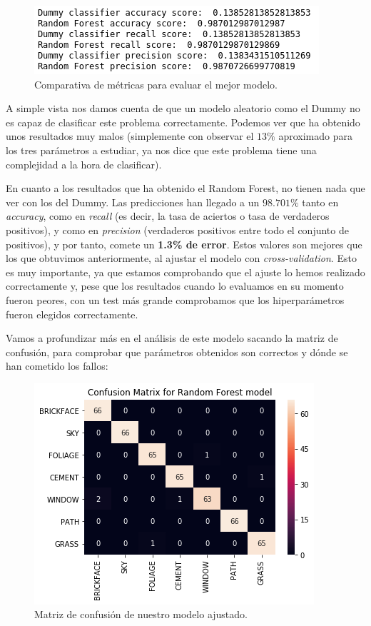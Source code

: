 \documentclass[11pt,a4paper]{article}
\begin{document}
\begin{figure}[H]
    \centering
    \includegraphics{img/model-comp-scores.png}
    \caption{Comparativa de métricas para evaluar el mejor modelo.}
    \label{fig:model-comp-scores}
\end{figure}

A simple vista nos damos cuenta de que un modelo aleatorio como el Dummy no es capaz de clasificar este problema correctamente. Podemos
ver que ha obtenido unos resultados muy malos (simplemente con observar el $13\%$ aproximado para los tres parámetros a estudiar, ya nos
dice que este problema tiene una complejidad a la hora de clasificar).

En cuanto a los resultados que ha obtenido el Random Forest, no tienen nada que ver con los del Dummy. Las predicciones han llegado a un
$98.701\%$ tanto en \textit{accuracy}, como en \textit{recall} (es decir, la tasa de aciertos o tasa de verdaderos positivos), y como en
\textit{precision} (verdaderos positivos entre todo el conjunto de positivos), y por tanto, comete un \textbf{1.3\% de error}. Estos
valores son mejores que los que obtuvimos anteriormente, al ajustar el modelo con \textit{cross-validation}. Esto es muy importante, ya
que estamos comprobando que el ajuste lo hemos realizado correctamente y, pese que los resultados cuando lo evaluamos en su momento fueron
peores, con un test más grande comprobamos que los hiperparámetros fueron elegidos correctamente.

Vamos a profundizar más en el análisis de este modelo sacando la matriz de confusión, para comprobar que parámetros obtenidos son
correctos y dónde se han cometido los fallos:

\begin{figure}[H]
    \centering
    \includegraphics[scale=0.7]{img/confusion-matrix.png}
    \caption{Matriz de confusión de nuestro modelo ajustado.}
    \label{fig:confusion-matrix}
\end{figure}
\end{document}
